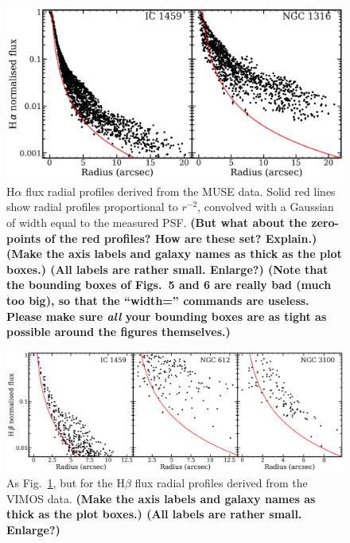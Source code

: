 \documentclass[a4paper,fleqn,usenatbib]{mnras}
\begin{document}
\begin{figure}
  \centering \includegraphics[width=\columnwidth]{Halpha_profile.png}
  \caption{H$\alpha$ flux radial profiles derived from the MUSE
    data. Solid red lines show radial profiles proportional to
    $r^{-2}$, convolved with a Gaussian of width equal to the measured
    PSF. {\bf (But what about the zero-points of the red profiles? How
      are these set? Explain.)} {\bf (Make the axis labels and galaxy
      names as thick as the plot boxes.) {\bf (All labels are rather
        small. Enlarge?)} {\bf (Note that the bounding boxes of
        Figs.~5 and 6 are really bad (much too big), so that the
        ``width='' commands are useless. Please make sure {\em all}
        your bounding boxes are as tight as possible around the
        figures themselves.)}}
    \label{fig:Ha_profile_MUSE}}
\end{figure}

\begin{figure}
  \centering
  \includegraphics[width=\columnwidth]{Hbeta_profile.png}
  \caption{As Fig.~\ref{fig:Ha_profile_MUSE}, but for the H$\beta$
    flux radial profiles derived from the VIMOS data. {\bf (Make the
      axis labels and galaxy names as thick as the plot boxes.) {\bf
        (All labels are rather small. Enlarge?)}}
    \label{fig:Hb_profile_VIMOS}}
\end{figure}
\end{document}
